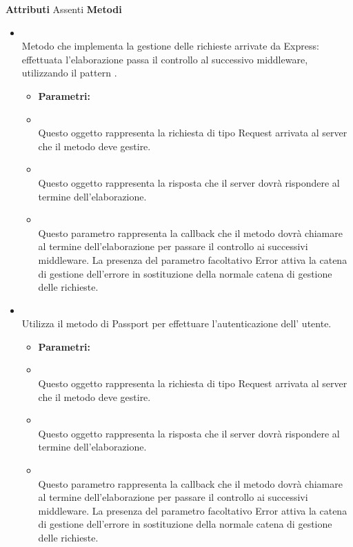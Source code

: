 \textbf{Attributi}
Assenti
\textbf{Metodi}
\begin{itemize}
\item[] \textbf{} \\ Metodo che implementa la gestione delle richieste arrivate da Express: effettuata l'elaborazione passa il controllo al successivo middleware, utilizzando il pattern .
\begin{itemize}\addtolength{\itemsep}{-0.5\baselineskip}
\item[] \textbf{Parametri:}
\item[]  \\ Questo oggetto rappresenta la richiesta di tipo Request arrivata al server che il metodo deve gestire.
\item[]  \\ Questo oggetto rappresenta la risposta che il server dovrà rispondere al termine dell'elaborazione.
\item[]  \\ Questo parametro rappresenta la callback che il metodo dovrà chiamare al termine dell'elaborazione per passare il controllo ai successivi middleware. La presenza del parametro facoltativo Error attiva la catena di gestione dell'errore in sostituzione della normale catena di gestione delle richieste.
\end{itemize}
\item[] \textbf{} \\ Utilizza il metodo  di Passport per effettuare l'autenticazione dell' utente.
\begin{itemize}\addtolength{\itemsep}{-0.5\baselineskip}
\item[] \textbf{Parametri:}
\item[]  \\ Questo oggetto rappresenta la richiesta di tipo Request arrivata al server che il metodo deve gestire.
\item[]  \\ Questo oggetto rappresenta la risposta che il server dovrà rispondere al termine dell'elaborazione.
\item[]  \\ Questo parametro rappresenta la callback che il metodo dovrà chiamare al termine dell'elaborazione per passare il controllo ai successivi middleware. La presenza del parametro facoltativo Error attiva la catena di gestione dell'errore in sostituzione della normale catena di gestione delle richieste.

\end{itemize}
\end{itemize}

